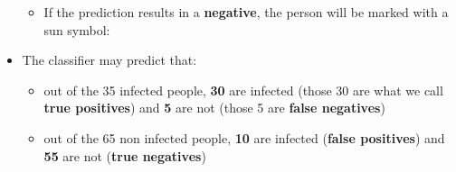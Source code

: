 \documentclass[12pt,a4paper]{article}
\begin{document}
\begin{itemize}
\begin{itemize}
\begin{description}
\end{description}
\item If the prediction results in a \colorbox{nRed}{\textbf{negative}}, the person will be marked with a sun symbol:
\end{itemize}
\item The classifier may predict that:
\begin{itemize}
\item out of the 35 \colorbox{pGreen}{infected people}, \textbf{30} are infected (those 30 are what we call \textbf{true positives}) and \textbf{5} are not (those 5 are \textbf{false negatives}) 
\item out of the 65 \colorbox{nRed}{non infected people}, \textbf{10} are infected (\textbf{false positives}) and \textbf{55} are not (\textbf{true negatives})
\end{itemize}
\end{itemize}
\end{document}
